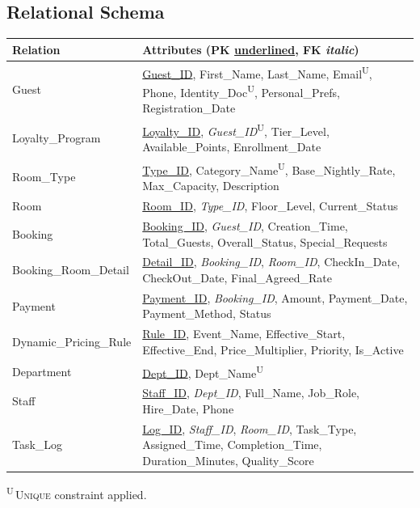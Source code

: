 \documentclass[11pt,a4paper]{article}
\begin{document}
\subsection{Relational Schema}
\begin{tabularx}{\linewidth}{@{}lX@{}}
\toprule
\textbf{Relation} & \textbf{Attributes (PK \underline{underlined}, FK \emph{italic})} \\
\midrule
Guest                 & \underline{Guest\_ID}, First\_Name, Last\_Name, Email\textsuperscript{U}, Phone, Identity\_Doc\textsuperscript{U}, Personal\_Prefs, Registration\_Date \\
Loyalty\_Program      & \underline{Loyalty\_ID}, \emph{Guest\_ID}\textsuperscript{U}, Tier\_Level, Available\_Points, Enrollment\_Date \\
Room\_Type            & \underline{Type\_ID}, Category\_Name\textsuperscript{U}, Base\_Nightly\_Rate, Max\_Capacity, Description \\
Room                  & \underline{Room\_ID}, \emph{Type\_ID}, Floor\_Level, Current\_Status \\
Booking               & \underline{Booking\_ID}, \emph{Guest\_ID}, Creation\_Time, Total\_Guests, Overall\_Status, Special\_Requests \\
Booking\_Room\_Detail & \underline{Detail\_ID}, \emph{Booking\_ID}, \emph{Room\_ID}, CheckIn\_Date, CheckOut\_Date, Final\_Agreed\_Rate \\
Payment               & \underline{Payment\_ID}, \emph{Booking\_ID}, Amount, Payment\_Date, Payment\_Method, Status \\
Dynamic\_Pricing\_Rule& \underline{Rule\_ID}, Event\_Name, Effective\_Start, Effective\_End, Price\_Multiplier, Priority, Is\_Active \\
Department            & \underline{Dept\_ID}, Dept\_Name\textsuperscript{U} \\
Staff                 & \underline{Staff\_ID}, \emph{Dept\_ID}, Full\_Name, Job\_Role, Hire\_Date, Phone \\
Task\_Log             & \underline{Log\_ID}, \emph{Staff\_ID}, \emph{Room\_ID}, Task\_Type, Assigned\_Time, Completion\_Time, Duration\_Minutes, Quality\_Score \\
\bottomrule
\end{tabularx}\par\vspace{2pt}
{\footnotesize\textsuperscript{U}\,\textsc{Unique} constraint applied.}
\end{document}
